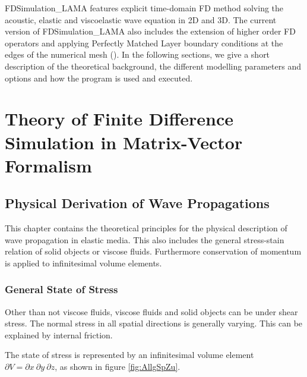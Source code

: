 \documentclass[pdftex,a4paper,parskip,listof=totoc,bibliography=totoc,onehalfspacing,12pt]{scrreprt}
\begin{document}
FDSimulation\_LAMA features explicit time-domain FD method solving the acoustic, elastic and viscoelastic wave equation in 2D and 3D. 
The current version of FDSimulation\_LAMA also includes the extension of higher order FD operators and applying Perfectly Matched Layer boundary conditions at the edges of the numerical mesh (\cite{komatitsch:07}).
In the following sections, we give a short description of the  theoretical background, the different modelling parameters and options and how the program is used and executed.



\cleardoublepage
\part{Theory of Finite Difference Simulation in Matrix-Vector Formalism}
\chapter{Physical Derivation of Wave Propagations}

This chapter contains the theoretical principles for the physical description of wave propagation in elastic media. This also includes the general stress-stain relation of solid objects or viscose fluids. Furthermore conservation of momentum is applied to infinitesimal volume elements.

\section{General State of Stress}
\label{kap:AllSp}

Other than not viscose fluids, viscose fluids and solid objects can be under shear stress. The normal stress in all spatial directions is generally varying. This can be explained by internal friction.

The state of stress is represented by an infinitesimal volume element  $\partial V = \partial x~ \partial y~ \partial z$, as shown in figure \ref{fig:AllgSpZu}.
\end{document}
